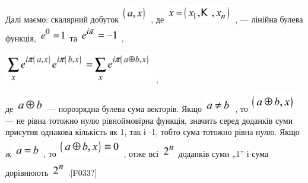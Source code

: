 Далі маємо: скалярний добуток 
\includegraphics[width=0.4681in,height=0.3055in]{crypt-img/crypt-img138.png} ,
де 
\includegraphics[width=1.1535in,height=0.3075in]{crypt-img/crypt-img139.png} ,
--- лінійна булева функція,  
\includegraphics[width=0.4953in,height=0.2862in]{crypt-img/crypt-img140.png} 
та 
\includegraphics[width=0.6811in,height=0.2917in]{crypt-img/crypt-img141.png} ,

{\centering
 \includegraphics[width=2.598in,height=0.5193in]{crypt-img/crypt-img142.png} ,
\par}

де  \includegraphics[width=0.5043in,height=0.2634in]{crypt-img/crypt-img143.png}
 --- порозрядна булева сума векторів. Якщо 
\includegraphics[width=0.4898in,height=0.25in]{crypt-img/crypt-img144.png} , то
 \includegraphics[width=0.8126in,height=0.3335in]{crypt-img/crypt-img145.png} 
--- не рівна тотожно нулю рівноймовірна функція, значить серед доданків суми
присутня однакова кількість як 1, так і -1, тобто сума тотожно рівна нулю. Якщо
ж  \includegraphics[width=0.472in,height=0.2508in]{crypt-img/crypt-img146.png}
, то 
\includegraphics[width=1.0866in,height=0.3307in]{crypt-img/crypt-img147.png} , 
отже всі 
\includegraphics[width=0.2516in,height=0.2917in]{crypt-img/crypt-img148.png}
доданків  суми „1”  і сума дорівнюють 
\includegraphics[width=0.2516in,height=0.2957in]{crypt-img/crypt-img149.png}
.\textlatin{[F033?]}

